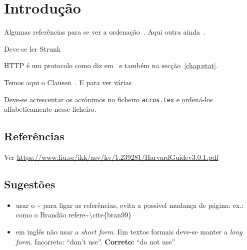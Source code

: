 \chapter{Introdução}\label{chap:intro}

Algumas referências para se ver a ordenação~\cite{yaacoub2012}. Aqui outra ainda~\cite{etsitr102732}.

Deve-se ler Strunk~\cite{strunk2007elements}

\ac{HTTP} é um protocolo como diz em~\cite{test2000} e também na secção~\ref{chap:stat}.

  Temos aqui o Clausen~\cite{Clausen2003}. E para ver várias~\cite{yaacoub2012, etsitr102732, strunk2007elements}

Deve-se acrescentar os acrónimos no ficheiro \texttt{acros.tex} e ordená-los alfabeticamente nesse ficheiro.

\section{Referências}
Ver \url{https://www.liu.se/ikk/asv/kv/1.239281/HarvardGuidev3.0.1.pdf}

\section{Sugestões}
\begin{itemize}
  \item usar o \textasciitilde{} para ligar as referências, evita a possível mudança de página: ex.: como o Brandão refere\textasciitilde\textbackslash{}cite\{bran99\}
  \item em inglês não usar a \emph{short form}. Em textos formais deve-se manter a \emph{long form}. Incorreto: ``don't use''. \textbf{Correto:} ``do not use''
\end{itemize}

